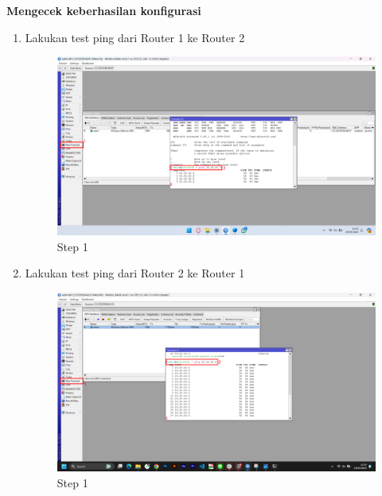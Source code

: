 \begin{center}
	\textbf{Mengecek keberhasilan konfigurasi}
	\begin{enumerate}
		\item Lakukan test ping dari Router 1 ke Router 2
		\begin{figure}[H]
			\centering
			\includegraphics[width=0.9\linewidth]{P1/img/per2/pc1/Step 4.png}
			\caption{Step 1}
			\label{fig:Ping Step 1(Per.2 PC1)}
		\end{figure}
		\item Lakukan test ping dari Router 2 ke Router 1
		\begin{figure}[H]
			\centering
			\includegraphics[width=0.9\linewidth]{P1/img/per1/pc2/Step 4.png}
			\caption{Step 1}
			\label{fig:Ping Step 2(Per.2 PC2)}
		\end{figure}
	\end{enumerate}
\end{center}

